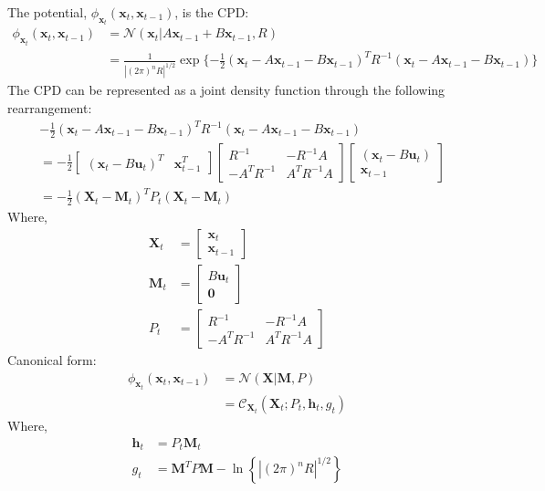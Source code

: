 The potential, $\phi_{\pmb{x}_t} (\pmb{x}_{t}, \pmb{x}_{t-1})$, is the CPD:
\begin{align}
\phi_{\pmb{x}_t} (\pmb{x}_{t}, \pmb{x}_{t-1}) &= \mathcal{N}\left(\pmb{x}_{t} | A \pmb{x}_{t-1} + B \pmb{x}_{t-1}, R \right) \nonumber \\
 &= \frac{1}{ | (2 \pi)^{n} R |^{1/2} } \exp{ \{ -\frac{1}{2} \left( \pmb{x}_{t} - A \pmb{x}_{t-1} - B \pmb{x}_{t-1} \right)^{T} R^{-1} \left( \pmb{x}_{t} - A \pmb{x}_{t-1} - B \pmb{x}_{t-1} \right)\} }
\end{align}
The CPD can be represented as a joint density function through the following rearrangement:
\begin{align}
& -\frac{1}{2} \left( \pmb{x}_{t} - A \pmb{x}_{t-1} - B \pmb{x}_{t-1} \right)^{T} R^{-1} \left( \pmb{x}_{t} - A \pmb{x}_{t-1} - B \pmb{x}_{t-1} \right) \nonumber \\
&= -\frac{1}{2} \begin{bmatrix} \left( \pmb{x}_{t} - B \pmb{u}_{t} \right)^{T} & \pmb{x}_{t-1}^{T} \end{bmatrix} \begin{bmatrix} R^{-1} & -R^{-1} A \\ -A^{T} R^{-1} & A^{T} R^{-1} A \end{bmatrix} \begin{bmatrix} \left( \pmb{x}_{t} - B \pmb{u}_{t} \right) \\ \pmb{x}_{t-1} \end{bmatrix} \nonumber \\
&= -\frac{1}{2} \left( \pmb{X}_{t} - \pmb{M}_t \right)^{T} P_t \left( \pmb{X}_{t} - \pmb{M}_t \right) 
\end{align}
Where,
\begin{align}
\pmb{X}_{t} &= \begin{bmatrix} \pmb{x}_t \\ \pmb{x}_{t-1} \end{bmatrix} \\
\pmb{M}_t &= \begin{bmatrix} B\pmb{u}_t \\ \pmb{0} \end{bmatrix} \\
P_t &= \begin{bmatrix} R^{-1} & -R^{-1} A \\ -A^{T} R^{-1} & A^{T} R^{-1} A \end{bmatrix}
\end{align}
Canonical form:
\begin{align}
\phi_{\pmb{x}_t} (\pmb{x}_{t}, \pmb{x}_{t-1}) &= \mathcal{N}\left( \pmb{X} | \pmb{M}, P \right) \nonumber \\
&= \mathcal{C}_{\pmb{X}_t} \left( \pmb{X}_t ; P_t, \pmb{h}_{t}, g_{t} \right)
\end{align}
Where, 
\begin{align}
\pmb{h}_{t} &= P_{t} \pmb{M}_{t} \\
g_{t} &= \pmb{M}^{T} P \pmb{M} - \ln{ \left\{ | (2 \pi)^{n} R |^{1/2} \right\} }
\end{align}

